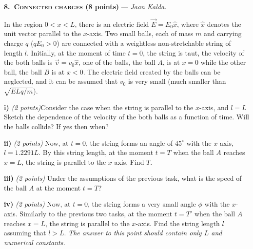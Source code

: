 \textbf{8.\ \textsc{Connected charges} (8 points)} --- \textit{Jaan Kalda.}

In the region $0 < x < L$, there is an electric field $\vec{E} = E_0\hat{x}$,
where $\hat{x}$ denotes the unit vector parallel to the $x$-axis. Two small
balls, each of mass $m$ and carrying charge $q$ ($qE_0 > 0$) are connected with
a weightless non-stretchable string of length $l$. Initially, at the moment of
time $t = 0$, the string is taut, the velocity of the both balls is
$\vec{v} = v_0\hat{x}$, one of the balls, the ball $A$, is at $x = 0$ while the
other ball, the ball $B$ is at $x < 0$. The electric field created by the balls
can be neglected, and it can be assumed that $v_0$ is very small (much smaller
than $\sqrt{ELq/m}$).

\textbf{i)} \textit{(2 points)}Consider the case when the string is parallel to
the $x$-axis, and $l = L$ Sketch the dependence of the velocity of the both
balls as a function of time. Will the balls collide? If yes then when?

\textbf{ii)} \textit{(2 points)} Now, at $t = 0$, the string forms an angle of
$45^\circ$ with the $x$-axis, $l = 1.2291L$. By this string length, at the
moment $t = T$ when the ball $A$ reaches $x = L$, the string is parallel to the
$x$-axis. Find $T$.

\textbf{iii)} \textit{(2 points)} Under the assumptions of the previous task,
what is the speed of the ball $A$ at the moment $t = T$?

\textbf{iv)} \textit{(2 points)} Now, at $t = 0$, the string forms a very small
angle $\phi$ with the $x$-axis. Similarly to the previous two tasks, at the
moment $t = T'$ when the ball $A$ reaches $x = L$, the string is parallel to the
$x$-axis. Find the string length $l$ assuming that $l > L$. \textit{The answer
to this point should contain only $L$ and numerical constants.}
